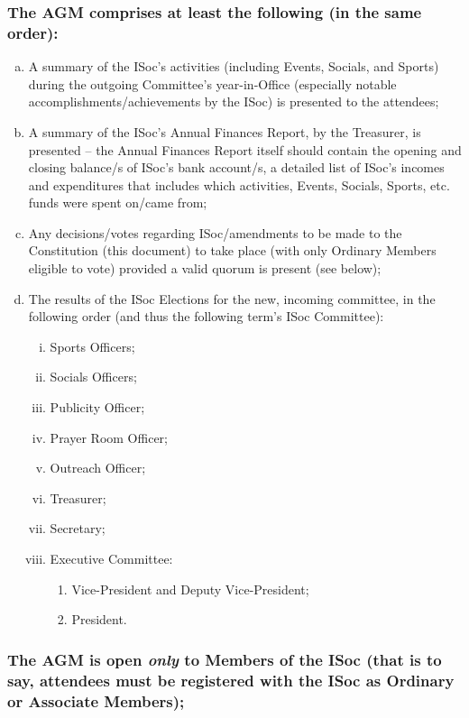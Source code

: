 \documentclass[12pt]{article}
\begin{document}
\subsubsection{The AGM comprises at least the following (in the same order):}
\begin{displayquote}
\begin{enumerate}[a.]
\item A summary of the ISoc's activities (including Events, Socials, and Sports) during the outgoing Committee's year-in-Office (especially notable accomplishments/achievements by the ISoc) is presented to the attendees;
\item A summary of the ISoc's Annual Finances Report, by the Treasurer, is presented -- the Annual Finances Report itself should contain the opening and closing balance/s of ISoc's bank account/s, a detailed list of ISoc's incomes and expenditures that includes which activities, Events, Socials, Sports, etc. funds were spent on/came from;
\item Any decisions/votes regarding ISoc/amendments to be made to the Constitution (this document) to take place (with only Ordinary Members eligible to vote) provided a valid quorum is present (see below);
\item The results of the ISoc Elections for the new, incoming committee, in the following order (and thus the following term's ISoc Committee):
\begin{enumerate}[i)]
\item Sports Officers;
\item Socials Officers;
\item Publicity Officer;
\item Prayer Room Officer;
\item Outreach Officer;
\item Treasurer;
\item Secretary;
\item Executive Committee:
\begin{enumerate}[1.]
\item Vice-President and Deputy Vice-President;
\item President.
\end{enumerate}
\end{enumerate}
\end{enumerate}
\end{displayquote}
\subsubsection{The AGM is open \emph{only} to Members of the ISoc (that is to say, attendees must be registered with the ISoc as Ordinary or Associate Members);}
\end{document}
